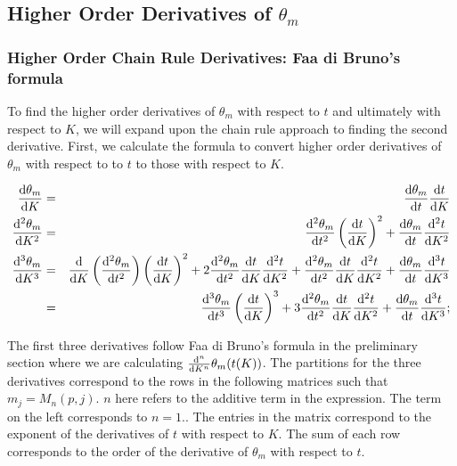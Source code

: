 \documentclass[11pt]{article} %
\begin{document}
\subsection{Higher Order Derivatives of $ \theta_m $}

\subsubsection{Higher Order Chain Rule Derivatives: Faa di Bruno's formula}
To find the higher order derivatives of $ \theta_m $ with respect to $ t $ and ultimately with respect to $ K $, we will expand upon the chain rule approach to finding the second derivative. First, we calculate the formula to convert higher order derivatives of $ \theta_m $ with respect to to $ t $ to those with respect to $ K $.

\begin{eqnarray}
\dv{\theta_m}{K} & = &  \dv{\theta_m}{t} \dv{t}{K} \\
\dv[2]{\theta_m}{K} & = & \dv[2]{\theta_m}{t} \left( \dv{t}{K} \right)^2 + \dv{\theta_m}{t} \dv[2]{t}{K} \\
\dv[3]{\theta_m}{K} & = & \dv{K} \left( \dv[2]{\theta_m}{t} \right) \left( \dv{t}{K} \right)^2 + 2 \dv[2]{\theta_m}{t} \dv{t}{K}  \dv[2]{t}{K}+ \dv[2]{\theta_m}{t} \dv{t}{K} \dv[2]{t}{K} + \dv{\theta_m}{t} \dv[3]{t}{K} \\
                             & = & \dv[3]{\theta_m}{t} \left( \dv{t}{K} \right)^3  + 3 \dv[2]{\theta_m}{t} \dv{t}{K}  \dv[2]{t}{K} +  \dv{\theta_m}{t} \dv[3]{t}{K};
\end{eqnarray}

The first three derivatives follow Faa di Bruno's formula in the preliminary section where we are calculating $ \dv[n]{K} \theta_m(t(K)) $. The partitions for the three derivatives correspond to the rows in the following matrices such that $ m_j = M_n(p,j) $. $ n $ here refers to the additive term in the expression. The term on the left corresponds to $ n =1 $.. The entries in the matrix correspond to the exponent of the derivatives of $ t $ with respect to $ K $. The sum of each row corresponds to the order of the derivative of $ \theta_m $ with respect to $ t $.
\end{document}
